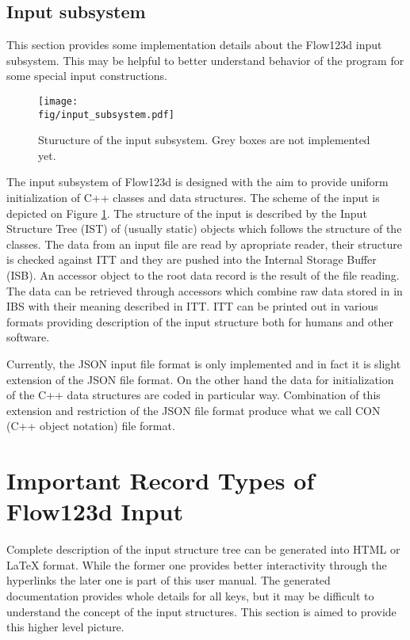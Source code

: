 


\subsection{Input subsystem}
This section provides some implementation details about the Flow123d input subsystem. This may be helpful to better understand behavior of the program for 
some special input constructions.

\begin{figure}
 \begin{center}
 \texttt{[image: \\fig/input\_subsystem.pdf]}
 \caption{Sturucture of the input subsystem. Grey boxes are not implemented yet.}
 \label{fig:input_subsystem}
 \end{center}
\end{figure}


The input subsystem of Flow123d is designed with the aim to provide uniform initialization of 
C++ classes and data structures. The scheme of the input is depicted on Figure \ref{fig:input_subsystem}.
The structure of the input is described by the Input Structure Tree (IST) of (usually static) objects which follows the structure of the classes.
The data from an input file are read by apropriate reader, their structure is checked against ITT and they are pushed into the Internal Storage Buffer (ISB).
An accessor object to the root data record is the result of the file reading. The data can be retrieved through accessors which combine 
raw data stored in in IBS with their meaning described in ITT. ITT can be printed out in various formats providing description of the input structure both for 
humans and other software.

Currently, the JSON input file format is only implemented and in fact it is slight extension of the JSON file format. On the other hand
the data for initialization of the C++ data structures are coded in particular way. Combination of this extension and restriction of the JSON file format produce 
what we call CON (C++ object notation) file format.


\section{Important Record Types of Flow123d Input}
Complete description of the input structure tree can be generated into HTML or LaTeX format. While the former one provides better interactivity 
through the hyperlinks the later one is part of this user manual. The generated documentation provides whole details for all keys, but 
it may be difficult to understand the concept of the input structures. This section is aimed to provide this higher level picture.


